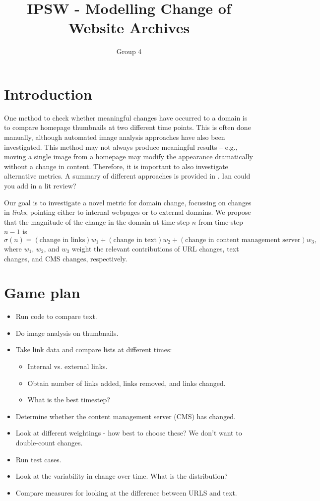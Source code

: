 \documentclass[10pt, a4paper]{article}
\begin{document}
\title{IPSW - Modelling Change of Website Archives}
\author{Group 4}
\date{\vspace{-5ex}}
\maketitle

\section{Introduction}
One method to check whether meaningful changes have occurred to a domain is to compare homepage thumbnails at two different time points. This is often done manually, although automated image analysis approaches have also been investigated. This method may not always produce meaningful results -- e.g., moving a single image from a homepage may modify the appearance dramatically without a change in content. Therefore, it is important to also investigate alternative metrics. A summary of different approaches is provided in \cite{diff_metrics}. {\color{red} Ian could you add in a lit review?}

Our goal is to investigate a novel metric for domain change, focussing on changes in \textit{links}, pointing either to internal webpages or to external domains. We propose that the  magnitude  of the change in the domain at time-step $n$ from time-step $n-1$ is
\begin{equation}
\sigma(n) = (\text{change in links})w_1 + (\text{change in text})w_2 + (\text{change in content management server})w_3,
\end{equation}
where $w_1$, $w_2$, and $w_3$ weight the relevant contributions of URL changes, text changes, and CMS changes, respectively.

\section{Game plan}
\begin{itemize}
\item Run code to compare text.
\item Do image analysis on thumbnails.
\item Take link data and compare lists at different times:
\begin{itemize}
\item Internal vs. external links.
\item Obtain number of links added, links removed, and links changed.
\item What is the best timestep?
\end{itemize}
\item Determine whether the content management server (CMS) has changed.
\item Look at different weightings - how best to choose these? We don't want to double-count changes.
\item Run test cases.
\item Look at the variability in change over time. What is the distribution?
\item Compare measures for looking at the difference between URLS and text.
\end{itemize} 
\end{document}
